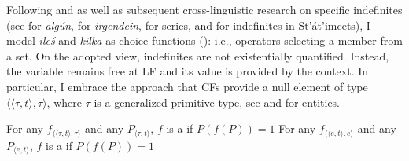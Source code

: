 \documentclass[output=paper, newtxmath, colorlinks, citecolor=brown]{langsci/langscibook}
\begin{document}
	Following \cite{reinhart1997quantifier} and \citet{kratzer1998scope} as well as subsequent cross-lin\-guis\-tic research on specific indefinites (see \citealt{alonso-ovalle_menendez-benito2003some} for  \textit{algún}, \citealt{kratzer_shimoyama2002indeterminate} for  \textit{irgendein}, \citealt{yanovich2005choice} for   series, and \citealt{matthewson1998interpretation} for indefinites in St’át’im\-cets), I model \textit{ileś} and \textit{kilka} as choice functions (): i.e., operators selecting a member from a set. On the adopted view,  indefinites are not existentially quantified. Instead, the  variable remains free at LF and its value is provided by the context. In particular, I embrace the approach that CFs provide a null  element of type $\langle \langle \tau,t\rangle,\tau \rangle$, where $\tau$ is a generalized primitive type, see  and  for entities.





 \ea \ea For any $f_{\langle \langle \tau,t\rangle,\tau\rangle}$ and any $P_{\langle \tau,t\rangle}$, $f$ is a  if $P(f(P))=1$\label{ex:cf-generalized}
 \ex For any $f_{\langle \langle e,t\rangle,e\rangle}$ and any $P_{\langle e,t\rangle}$, $f$ is a  if $P(f(P))=1$\label{ex:cf-individuals}
 \z\z
\end{document}

